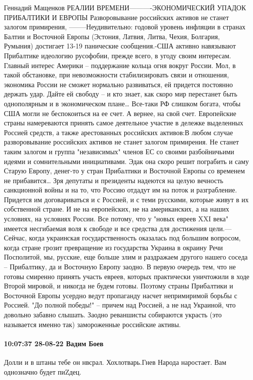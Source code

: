 Геннадий Мащенков
РЕАЛИИ ВРЕМЕНИ----------ЭКОНОМИЧЕСКИЙ УПАДОК ПРИБАЛТИКИ И
ЕВРОПЫ Разворовывание российских активов не станет залогом
примирения, --------Неудивительно: годовой уровень
инфляции в странах Балтии и Восточной Европы (Эстония, Латвия, Литва,
Чехия, Болгария, Румыния) достигает 13-19%
панические сообщения.-США активно навязывают Прибалтике идеологию
русофобии, прежде всего, в
угоду своим интересам. Главный интерес Америки – поддержание кольца огня
вокруг России. Мол, в такой обстановке, при невозможности
стабилизировать связи и отношения, экономика России не сможет нормально
развиваться, ей придется постоянно держать удар. Дайте ей свободу – и
кто знает, как скоро мир перестанет быть однополярным и в экономическом
плане… Все-таки РФ слишком богата, чтобы США могли не беспокоиться на ее
счет. А вернее, на свой счет.
Европейские страны намереваются принять самое деятельное участие в
дележке выделенных Россией средств, а также арестованных российских
активов:В любом случае разворовывание российских активов не станет залогом
примирения. Не станет таким залогом и группа "независимых" членов ЕС со
своими разбойничьими идеями и сомнительными инициативами. Эдак она скоро
решит пограбить и саму Старую Европу, денег-то у стран Прибалтики и
Восточной Европы со временем не прибавится…
Зря депутаты и
президенты надеются на целую вечность санкционной войны и на то, что
Россию отдадут им на поток и разграбление. Придется им договариваться и с
Россией, и с теми русскими, которые живут в их собственной стране. И не
на европейских, не на американских, а на наших условиях, на условиях
России. Все потому, что у "новых евреев XXI века" имеется несгибаемая
воля к свободе и все средства для достижения цели.---Сейчас, когда украинская государственность оказалась под большим
вопросом, когда стране грозит превращение из государства Украина в
окраину Речи Посполитой, мы, русские, еще больше злим и раздражаем
другого нашего соседа – Прибалтику, да и Восточную Европу заодно. В
первую очередь тем, что не готовы смиренно принять участь евреев,
которых практически уничтожили в ходе Второй мировой, и никогда не будем
готовы. Поэтому страны Прибалтики и Восточной Европы усердно ведут
пропаганду насчет непримиримой борьбы с Россией. "До полной победы!" –
причем над Россией, а не над Украиной, что довольно забавно слышать.
Заодно реваншисты собираются украсть (это называется именно так)
замороженные российские активы.

\paragraph{10:07:37 28-08-22 Вадим Боев}

Долли и в штаны тебе он нвсрал. Хохлотварь.Гнев Народа наростает. Вам
однозначно будет пиZдец.



